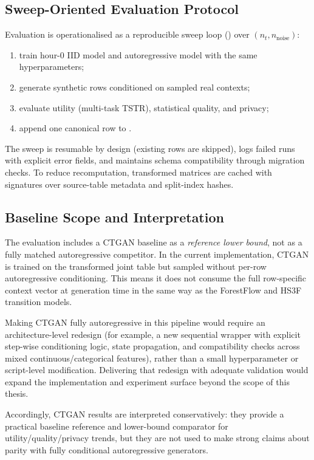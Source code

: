 \subsection{Sweep-Oriented Evaluation Protocol}

Evaluation is operationalised as a reproducible sweep loop () over $(n_t, n_{\text{noise}})$:
\begin{enumerate}\tightlist
    \item train hour-0 IID model and autoregressive model with the same hyperparameters;
    \item generate synthetic rows conditioned on sampled real contexts;
    \item evaluate utility (multi-task TSTR), statistical quality, and privacy;
    \item append one canonical row to .
\end{enumerate}

The sweep is resumable by design (existing rows are skipped), logs failed runs with explicit error fields, and maintains schema compatibility through migration checks. To reduce recomputation, transformed matrices are cached with signatures over source-table metadata and split-index hashes.

\subsection{Baseline Scope and Interpretation}
\label{sec:baseline-scope}

The evaluation includes a CTGAN baseline as a \emph{reference lower bound}, not as a fully matched autoregressive competitor. In the current implementation, CTGAN is trained on the transformed joint table but sampled without per-row autoregressive conditioning. This means it does not consume the full row-specific context vector at generation time in the same way as the ForestFlow and HS3F transition models.

Making CTGAN fully autoregressive in this pipeline would require an architecture-level redesign (for example, a new sequential wrapper with explicit step-wise conditioning logic, state propagation, and compatibility checks across mixed continuous/categorical features), rather than a small hyperparameter or script-level modification. Delivering that redesign with adequate validation would expand the implementation and experiment surface beyond the scope of this thesis.

Accordingly, CTGAN results are interpreted conservatively: they provide a practical baseline reference and lower-bound comparator for utility/quality/privacy trends, but they are not used to make strong claims about parity with fully conditional autoregressive generators.

